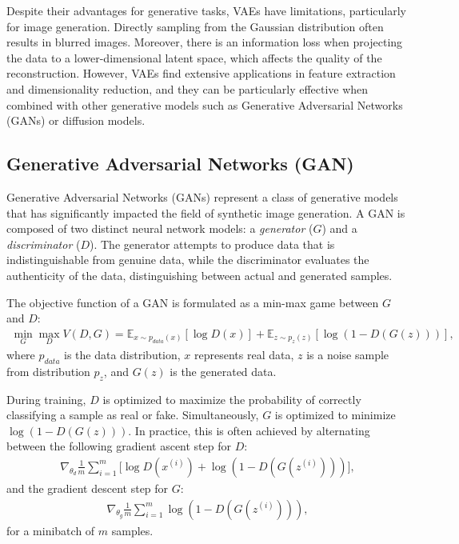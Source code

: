 \documentclass[11pt,a4paper,oneside]{report}
\begin{document}
Despite their advantages for generative tasks, VAEs have limitations, particularly for image generation. Directly sampling from the Gaussian distribution often results in blurred images. Moreover, there is an information loss when projecting the data to a lower-dimensional latent space, which affects the quality of the reconstruction. However, VAEs find extensive applications in feature extraction and dimensionality reduction, and they can be particularly effective when combined with other generative models such as Generative Adversarial Networks (GANs) or diffusion models.


\subsection{Generative Adversarial Networks (GAN)}

Generative Adversarial Networks (GANs) represent a class of generative models that has significantly impacted the field of synthetic image generation. A GAN is composed of two distinct neural network models: a \textit{generator} ($G$) and a \textit{discriminator} ($D$). The generator attempts to produce data that is indistinguishable from genuine data, while the discriminator evaluates the authenticity of the data, distinguishing between actual and generated samples.

The objective function of a GAN is formulated as a min-max game between $G$ and $D$:
\begin{align}
\min_{G} \max_{D} V(D, G) = \mathbb{E}_{x\sim p_{data}(x)}[\log D(x)] + \mathbb{E}_{z\sim p_{z}(z)}[\log (1 - D(G(z)))],
\end{align}
where $p_{data}$ is the data distribution, $x$ represents real data, $z$ is a noise sample from distribution $p_z$, and $G(z)$ is the generated data.

During training, $D$ is optimized to maximize the probability of correctly classifying a sample as real or fake. Simultaneously, $G$ is optimized to minimize $\log(1 - D(G(z)))$. In practice, this is often achieved by alternating between the following gradient ascent step for $D$:
\begin{align}
\nabla_{\theta_d} \frac{1}{m} \sum_{i=1}^{m} \Big[ \log D(x^{(i)}) + \log (1 - D(G(z^{(i)}))) \Big],
\end{align}
and the gradient descent step for $G$:
\begin{align}
\nabla_{\theta_g} \frac{1}{m} \sum_{i=1}^{m} \log (1 - D(G(z^{(i)}))),
\end{align}
for a minibatch of $m$ samples.
\end{document}
